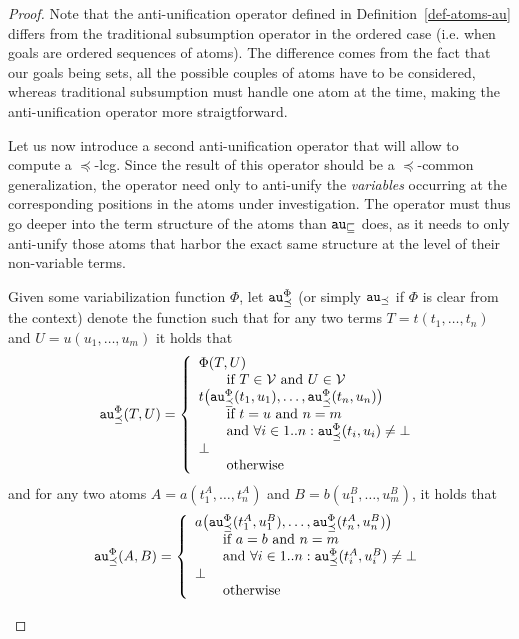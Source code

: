 \begin{proof}
Note that the anti-unification operator defined in Definition~\ref{def-atoms-au} differs from the traditional subsumption operator in the ordered case (i.e. when goals are ordered sequences of atoms). The difference comes from the fact that our goals being sets, all the possible couples of atoms have to be considered, whereas traditional subsumption must handle one atom at the time, making the anti-unification operator more straigtforward.     

Let us now introduce a second anti-unification operator that will allow to compute a $\preceq$-lcg. 
Since the result of this operator should be a $\preceq$-common generalization, the operator need only to anti-unify the \textit{variables} occurring at the corresponding positions in the atoms under investigation. 
The operator must thus go deeper into the term structure of the atoms than $\texttt{au}_\sqsubseteq$ does, as it needs to only anti-unify those atoms that harbor the exact same structure at the level of their non-variable terms.
\begin{definition}%
	\label{def-term-au-through-variables}
	Given some variabilization function $\Phi$, let $\texttt{au}^\Phi_\preceq$ (or simply $\texttt{au}_\preceq$ if $\Phi$ is clear from the context) denote the function such that for any two terms $T = t(t_1, \dots, t_n)$ and $U = u(u_1, \dots, u_m)$ it holds that
	\[\texttt{au}^\Phi_\preceq(T,U)=\left\{\begin{array}{l}
		\Phi(T,U) 
		\\ \qquad \mbox{if } T\in\mathcal{V}\mbox{ and } U\in\mathcal{V}
		\\t\big(\texttt{au}^\Phi_\preceq(t_1,u_1), \dots, \texttt{au}^\Phi_\preceq(t_n, u_n)\big) 
		\\ \qquad \mbox{if } t = u \mbox{ and } n = m 
		\\ \qquad \mbox{and } \forall i \in 1..n: \texttt{au}^\Phi_\preceq(t_i,u_i)\neq\bot
		\\ \bot
		\\ \qquad  \mbox{otherwise}
	\end{array}\right.\]
	and for any two atoms $A = a(t^A_1, \dots, t^A_n)$ and $B = b(u^B_1, \dots, u^B_m)$, it holds that
	\[\texttt{au}^\Phi_\preceq(A,B)=\left\{\begin{array}{l}
		a\big(\texttt{au}^\Phi_\preceq(t^A_1, u^B_1),\dots, \texttt{au}^\Phi_\preceq(t^A_n, u^B_n)\big) 
		\\ \qquad \mbox{if } a = b \mbox{ and } n = m 
		\\ \qquad \mbox{and } \forall i \in 1..n: \texttt{au}^\Phi_\preceq(t^A_i, u^B_i) \neq\bot
		\\ \bot  
		\\ \qquad \mbox{otherwise}
	\end{array}\right.\]
\end{definition}


\end{proof}
